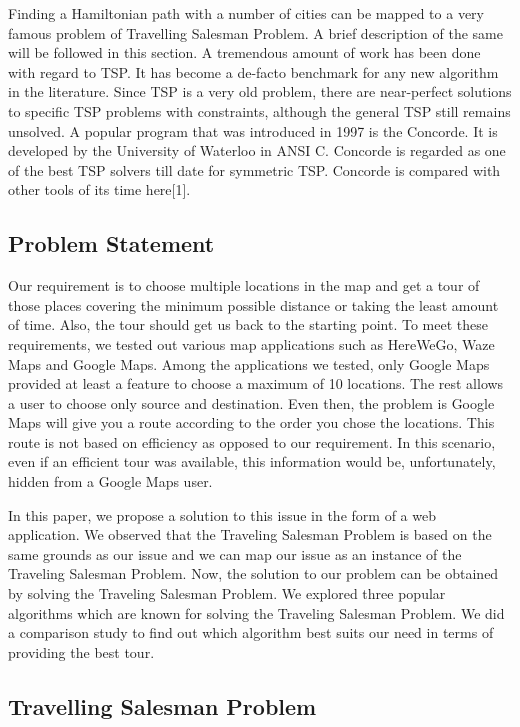 \documentclass[conference]{IEEEtran}
\begin{document}
Finding a Hamiltonian path with a number of cities can be mapped to a very famous problem of Travelling Salesman Problem. A brief description of the same will be followed in this section. A tremendous amount of work has been done with regard to TSP. It has become a de-facto benchmark for any new algorithm in the literature. Since TSP is a very old problem, there are near-perfect solutions to specific TSP problems with constraints, although the general TSP still remains unsolved. A popular program that was introduced in 1997 is the Concorde. It is developed by the University of Waterloo in ANSI C. Concorde is regarded as one of the best TSP solvers till date for symmetric TSP. Concorde is compared with other tools of its time here[1].

\subsection {Problem Statement}

Our requirement is to choose multiple locations in the map and get a tour of those places covering the minimum possible distance or taking the least amount of time. Also, the tour should get us back to the starting point. To meet these requirements, we tested out various map applications such as HereWeGo, Waze Maps and Google Maps. Among the applications we tested, only Google Maps provided at least a feature to choose a maximum of 10 locations. The rest allows a user to choose only source and destination. Even then, the problem is Google Maps will give you a route according to the order you chose the locations. This route is not based on efficiency as opposed to our requirement. In this scenario, even if an efficient tour was available, this information would be, unfortunately, hidden from a Google Maps user. 

In this paper, we propose a solution to this issue in the form of a web application. We observed that the Traveling Salesman Problem is based on the same grounds as our issue and we can map our issue as an instance of the Traveling Salesman Problem. Now, the solution to our problem can be obtained by solving the Traveling Salesman Problem. We explored three popular algorithms which are known for solving the Traveling Salesman Problem. We did a comparison study to find out which algorithm best suits our need in terms of providing the best tour.


\subsection {Travelling Salesman Problem}
\end{document}

